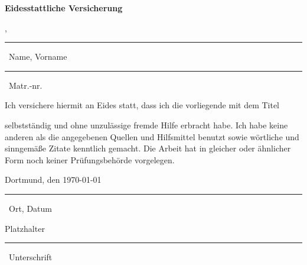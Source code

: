 \parindent 0pt
\cleardoublepage

{\centering \hspace*{1cm}\Large \textbf{Eidesstattliche Versicherung} 

}

\normalsize
\vspace*{1cm}

\parbox{5cm}{ \centering \MeinNachname, \MeinVorame 
\vspace*{0,1cm}
\hrule
\vspace*{0,1cm}
\strut \small \ Name, Vorname} \hfill
\parbox{3cm}{ \centering \MeineMatrikelnummer 
\vspace*{0,15cm}
\hrule
\vspace*{0,1cm}
\strut \small \ Matr.-nr.}

\vspace*{1cm}

Ich versichere hiermit an Eides statt, dass ich die vorliegende \MeineArbeit mit dem Titel

\vspace{0,25cm}
{
\centering
\textbf{\MeinTitel}

}
\vspace{0,25cm}

selbstständig und ohne unzulässige fremde Hilfe erbracht habe. Ich habe keine anderen als die angegebenen Quellen und Hilfsmittel benutzt sowie wörtliche und sinngemäße Zitate kenntlich gemacht. Die Arbeit hat in gleicher oder ähnlicher Form noch keiner Prüfungsbehörde vorgelegen. 
\vspace*{1cm}

\parbox{6.2cm}{ Dortmund, den \today
\vspace*{0,1cm}
\hrule
\vspace*{0,2cm}
\strut \small \ Ort, Datum} \hfill
\parbox{5cm}{ \color{white} Platzhalter \color{black}
\vspace*{0,1cm}
\hrule
\vspace*{0,2cm}
\strut \small \ Unterschrift}

\vspace*{1,5cm}


